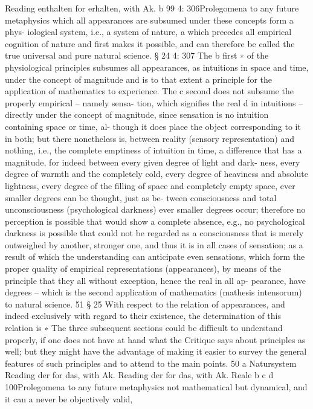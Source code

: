 Reading enthalten for erhalten, with Ak.
b
99
4: 306Prolegomena to any future metaphysics
which all appearances are subsumed under these concepts form a phys-
iological system, i.e., a system of nature, a which precedes all empirical
cognition of nature and ﬁrst makes it possible, and can therefore be called
the true universal and pure natural science.
§ 24
4: 307
The b ﬁrst ∗ of the physiological principles subsumes all appearances, as
intuitions in space and time, under the concept of magnitude and is to
that extent a principle for the application of mathematics to experience.
The c second does not subsume the properly empirical – namely sensa-
tion, which signiﬁes the real d in intuitions – directly under the concept
of magnitude, since sensation is no intuition containing space or time, al-
though it does place the object corresponding to it in both; but there
nonetheless is, between reality (sensory representation) and nothing,
i.e., the complete emptiness of intuition in time, a difference that has
a magnitude, for indeed between every given degree of light and dark-
ness, every degree of warmth and the completely cold, every degree of
heaviness and absolute lightness, every degree of the ﬁlling of space and
completely empty space, ever smaller degrees can be thought, just as be-
tween consciousness and total unconsciousness (psychological darkness)
ever smaller degrees occur; therefore no perception is possible that would
show a complete absence, e.g., no psychological darkness is possible that
could not be regarded as a consciousness that is merely outweighed by
another, stronger one, and thus it is in all cases of sensation; as a result
of which the understanding can anticipate even sensations, which form
the proper quality of empirical representations (appearances), by means
of the principle that they all without exception, hence the real in all ap-
pearance, have degrees – which is the second application of mathematics
(mathesis intensorum) to natural science. 51
§ 25
With respect to the relation of appearances, and indeed exclusively
with regard to their existence, the determination of this relation is
∗ The three subsequent sections could be difﬁcult to understand properly, if one
does not have at hand what the Critique says about principles as well; but they
might have the advantage of making it easier to survey the general features of
such principles and to attend to the main points. 50
a Natursystem
Reading der for das, with Ak.
Reading der for das, with Ak.
Reale
b
c
d
100Prolegomena to any future metaphysics
not mathematical but dynamical, and it can a never be objectively valid,
